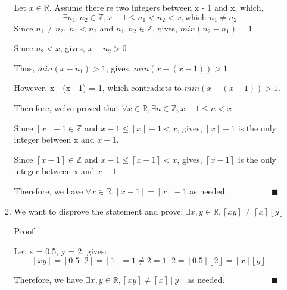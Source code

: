\documentclass[12pt]{article}
\begin{document}
\begin{enumerate}[label=(\alph*)]
\begin{enumerate}[label=(\roman*)]
Let $x \in \mathbb{R}$. Assume there're two integers between x - 1 and x, which, 
$$\exists n_1, n_2 \in \mathbb{Z}, x - 1 \leq n_1 < n_2 < x, \text{which }n_1 \neq n_2$$
Since $n_1 \neq n_2,\ n_1 < n_2$ and $n_1, n_2 \in \mathbb{Z}$, gives, $min(n_2 - n_1) = 1$

Since $n_2<x$, gives, $x-n_2>0$

Thus, $min(x - n_1) > 1$, gives, $min(x - (x-1)) > 1$

However, x - (x - 1) = 1, which contradicts to $min(x - (x-1)) > 1$.

Therefore, we've proved that $\forall x \in \mathbb{R}, \exists n \in \mathbb{Z}, x -1 \leq n < x $

Since $\left \lceil x \right \rceil - 1 \in \mathbb{Z}$ and $x - 1 \leq \left \lceil x \right \rceil - 1 < x$, gives, $\left \lceil x \right \rceil - 1$ is the only integer between x and $x - 1$.

Since $\left \lceil x - 1 \right \rceil \in \mathbb{Z}$ and $x - 1 \leq \left \lceil x - 1 \right \rceil < x $, gives, $\left \lceil x - 1 \right \rceil$ is the only integer between x and $x - 1$

Therefore, we have $\forall x \in \mathbb{R}, \left \lceil x-1 \right \rceil = \left \lceil x \right \rceil - 1$ as needed. $\quad \quad \quad \quad \quad \blacksquare $

		\item We want to disprove the statement and prove: $\exists x,y \in \mathbb{R}, \left \lceil xy \right \rceil \neq \left \lceil x \right \rceil \left \lfloor y \right \rfloor$

Proof
    
Let  x = 0.5, y = 2, gives:
$$\left \lceil xy \right \rceil = \left \lceil 0.5 \cdot 2 \right \rceil  =  \left \lceil 1 \right \rceil = 1 \neq 2 = 1 \cdot 2 = \left \lceil 0.5 \right \rceil \left \lfloor 2 \right \rfloor = \left \lceil x \right \rceil \left \lfloor y \right \rfloor \ $$

Therefore, we have $\exists x,y \in \mathbb{R}, \left \lceil xy \right \rceil \neq \left \lceil x \right \rceil \left \lfloor y \right \rfloor$ as needed. $\quad \quad \quad \quad \quad \ \blacksquare $
	\end{enumerate}
\end{enumerate}

\newpage
\end{document}
